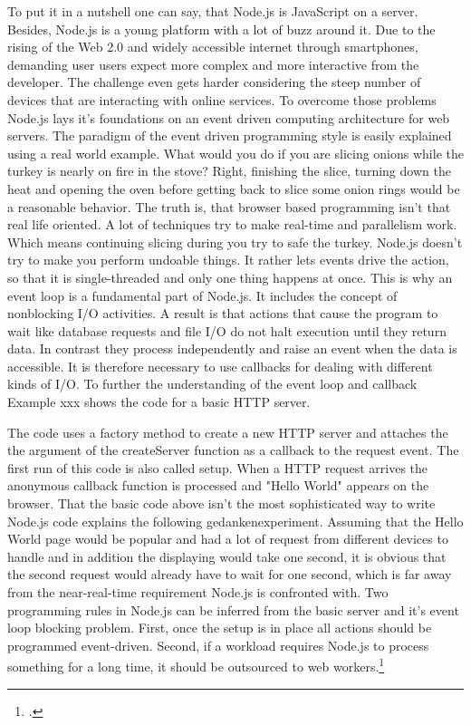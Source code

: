 To put it in a nutshell one can say, that Node.js is JavaScript on a server.
Besides, Node.js is a young platform with a lot of buzz around it. Due to the rising of the Web 2.0 and widely accessible internet through smartphones, demanding user users expect more complex and more interactive from the developer. The challenge even gets harder considering the steep number of devices that are interacting with online services. To overcome those problems Node.js lays it's foundations on an event driven computing architecture for web servers. 
The paradigm of the event driven programming style is easily explained using a real world example. What would you do if you are slicing onions while the turkey is nearly on fire in the stove? Right, finishing the slice, turning down the heat and opening the oven before getting back to slice some onion rings would be a reasonable behavior. The truth is, that browser based programming isn't that real life oriented. A lot of techniques try to make real-time and parallelism work. Which means continuing slicing during you try to safe the turkey. Node.js doesn't try to make you perform undoable things. It rather lets events drive the action, so that it is single-threaded and only one thing happens at once. This is why an event loop is a fundamental part of Node.js. It includes the concept of nonblocking I/O activities. A result is that actions that cause the program to wait like database requests and file I/O  do not halt execution until they return data. In contrast they process independently and raise an event when the data is accessible. It is therefore necessary to use callbacks for dealing with different kinds of I/O.
To further the understanding of the event loop and callback Example xxx shows the code for a basic HTTP server.





The code uses a factory method to create a new HTTP server and attaches the the argument of the createServer function as a callback to the request event. The first run of this code is also called setup. When a HTTP request arrives the anonymous callback function is processed and "Hello World" appears on the browser.  
That the basic code above isn't the most sophisticated way to write Node.js code explains the following gedankenexperiment. Assuming that the Hello World page would be popular and had a lot of request from different devices to handle and in addition the displaying would take one second, it is obvious that the second request would already have to wait for one second, which is far away from the near-real-time requirement Node.js is confronted with. 
Two programming rules in Node.js can be inferred from the basic server and it's event loop blocking problem. First, once the setup is in place all actions should be programmed event-driven. Second, if a workload requires Node.js to process something for a long time, it should be outsourced to web workers.\footcite[Cf.][]{Croucher_2012}



